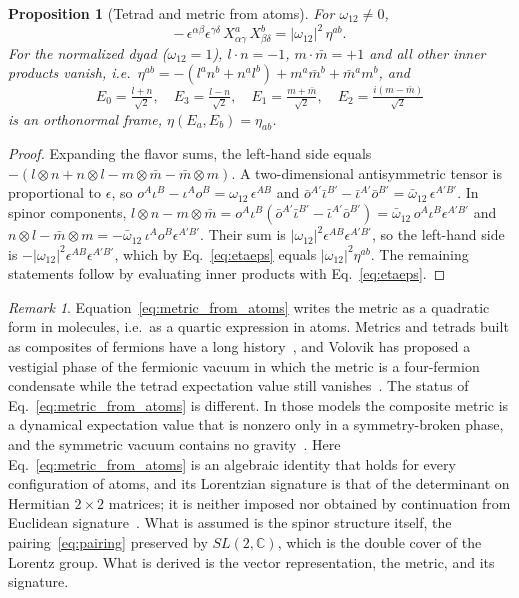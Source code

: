 \documentclass[reprint,aps,prd,amsmath,amssymb,superscriptaddress,nofootinbib,floatfix]{revtex4-2}
\theoremstyle{plain}
\newtheorem{proposition}{Proposition}
\theoremstyle{definition}
\theoremstyle{remark}
\newtheorem*{remark}{Remark}
\newcommand{\Mol}{\ensuremath{X}}                 %
\newcommand{\SLC}{SL(2,\mathbb{C})}
\begin{document}
\begin{proposition}[Tetrad and metric from atoms]
\label{prop:tetrad}
For $\omega_{12}\neq0$,
\begin{equation}
-\,\epsilon^{\alpha\beta}\epsilon^{\gamma\delta}\,\Mol^a_{\alpha\gamma}\,\Mol^b_{\beta\delta}
=|\omega_{12}|^2\,\eta^{ab}.
\label{eq:metric_from_atoms}
\end{equation}
For the normalized dyad ($\omega_{12}=1$), $l\cdot n=-1$, $m\cdot\bar m=+1$ and all other inner products
vanish, i.e.\ $\eta^{ab}=-(l^an^b+n^al^b)+m^a\bar m^b+\bar m^a m^b$, and
\begin{equation}
E_0=\tfrac{l+n}{\sqrt2},\quad E_3=\tfrac{l-n}{\sqrt2},\quad
E_1=\tfrac{m+\bar m}{\sqrt2},\quad E_2=\tfrac{i(m-\bar m)}{\sqrt2}
\label{eq:frame}
\end{equation}
is an orthonormal frame, $\eta(E_a,E_b)=\eta_{ab}$.
\end{proposition}
\begin{proof}
Expanding the flavor sums, the left-hand side equals $-(l\otimes n+n\otimes l-m\otimes\bar m-\bar m\otimes m)$.
A two-dimensional antisymmetric tensor is proportional to $\epsilon$, so $o^A\iota^B-\iota^Ao^B=\omega_{12}\,\epsilon^{AB}$
and $\bar o^{A'}\bar\iota^{B'}-\bar\iota^{A'}\bar o^{B'}=\bar\omega_{12}\,\epsilon^{A'B'}$. In spinor components,
$l\otimes n-m\otimes\bar m=o^A\iota^B(\bar o^{A'}\bar\iota^{B'}-\bar\iota^{A'}\bar o^{B'})
=\bar\omega_{12}\,o^A\iota^B\epsilon^{A'B'}$ and $n\otimes l-\bar m\otimes m=-\bar\omega_{12}\,\iota^Ao^B\epsilon^{A'B'}$.
Their sum is $|\omega_{12}|^2\epsilon^{AB}\epsilon^{A'B'}$, so the left-hand side is
$-|\omega_{12}|^2\epsilon^{AB}\epsilon^{A'B'}$, which by Eq.~\eqref{eq:etaeps} equals $|\omega_{12}|^2\eta^{ab}$.
The remaining statements follow by evaluating inner products with Eq.~\eqref{eq:etaeps}.
\end{proof}
\begin{remark}
Equation~\eqref{eq:metric_from_atoms} writes the metric as a quadratic form in molecules, i.e.\ as a quartic expression in
atoms. Metrics and tetrads built as composites of fermions have a long history~\cite{Akama1978,Wetterich2004,Diakonov2011},
and Volovik has proposed a vestigial phase of the fermionic vacuum in which the metric is a four-fermion condensate while
the tetrad expectation value still vanishes~\cite{Volovik2024}. The status of Eq.~\eqref{eq:metric_from_atoms} is different.
In those models the composite metric is a dynamical expectation value that is nonzero only in a symmetry-broken phase, and
the symmetric vacuum contains no gravity~\cite{Volovik2022}. Here Eq.~\eqref{eq:metric_from_atoms} is an algebraic identity
that holds for every configuration of atoms, and its Lorentzian signature is that of the determinant on Hermitian
$2\times2$ matrices; it is neither imposed nor obtained by continuation from Euclidean signature~\cite{Diakonov2011}. What is
assumed is the spinor structure itself, the pairing~\eqref{eq:pairing} preserved by $\SLC$, which is the double cover of
the Lorentz group. What is derived is the vector representation, the metric, and its signature.
\end{remark}
\end{document}
